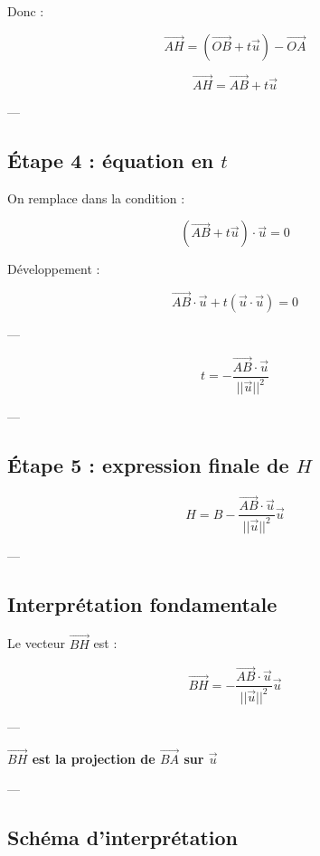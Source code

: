 \documentclass[11pt,a4paper]{article}
\begin{document}
Donc :

\[
\vec{AH} = (\vec{OB} + t\vec{u}) - \vec{OA}
\]

\[
\boxed{
\vec{AH} = \vec{AB} + t\vec{u}
}
\]

---

\subsection{Étape 4 : équation en $t$}

On remplace dans la condition :

\[
(\vec{AB} + t\vec{u}) \cdot \vec{u} = 0
\]

Développement :

\[
\vec{AB} \cdot \vec{u} + t (\vec{u} \cdot \vec{u}) = 0
\]

---

\[
\boxed{
t = - \frac{\vec{AB} \cdot \vec{u}}{||\vec{u}||^2}
}
\]

---

\subsection{Étape 5 : expression finale de $H$}

\[
\boxed{
H = B - \frac{\vec{AB} \cdot \vec{u}}{||\vec{u}||^2} \vec{u}
}
\]

---

\subsection{Interprétation fondamentale}

Le vecteur $\vec{BH}$ est :

\[
\vec{BH} = - \frac{\vec{AB} \cdot \vec{u}}{||\vec{u}||^2} \vec{u}
\]

---

\begin{center}
\textbf{$\vec{BH}$ est la projection de $\vec{BA}$ sur $\vec{u}$}
\end{center}

---

\subsection{Schéma d’interprétation}
\end{document}
